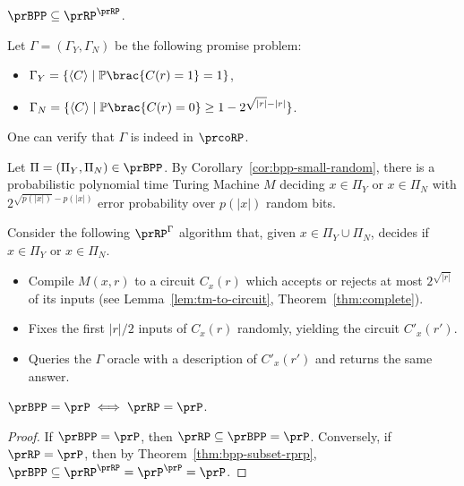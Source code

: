 \begin{theorem}\label{thm:bpp-subset-rprp}
    $\prBPP \subseteq \prRP^\prRP$.
\end{theorem}

\begin{proofsk}
    Let $\Gamma = (\Gamma_Y, \Gamma_N)$ be the following promise problem:
    \begin{itemize}
        \item $\Gamma_Y = \set{\langle C \rangle \mid \Pr\brac{C(r) = 1} = 1}$,
        \item $\Gamma_N = \set{\langle C \rangle \mid \Pr\brac{C(r) = 0} \geq 1 - 2^{\sqrt{|r|} - |r|}}$.
    \end{itemize}
    One can verify that $\Gamma$ is indeed in $\prcoRP$.

    Let $\Pi = (\Pi_Y, \Pi_N) \in \prBPP$.
    By Corollary~\ref{cor:bpp-small-random}, there is a probabilistic polynomial time 
    Turing Machine $M$ deciding $x \in \Pi_Y$ or $x \in \Pi_N$ with $2^{\sqrt{p(|x|)} 
    - p(|x|)}$ error probability over $p(|x|)$ random bits.
    
    Consider the following $\prRP^\Gamma$ algorithm that, given $x \in \Pi_Y \cup \Pi_N$, 
    decides if $x \in \Pi_Y$ or $x \in \Pi_N$.
    \begin{itemize}
        \item Compile $M(x,r)$ to a circuit $C_x(r)$ which accepts or rejects at most 
            $2^{\sqrt{|r|}}$ of its inputs (see Lemma~\ref{lem:tm-to-circuit}, 
            Theorem~\ref{thm:complete}).
        \item Fixes the first $|r|/2$ inputs of $C_x(r)$ randomly, yielding the circuit 
            $C'_x(r')$.
        \item Queries the $\Gamma$ oracle with a description of $C'_x(r')$ and returns 
            the same answer.
    \end{itemize}

\end{proofsk}

\begin{corollary}
    $\prBPP = \prP \iff \prRP = \prP$.
\end{corollary}

\begin{proof}
    If $\prBPP = \prP$, then $\prRP \subseteq \prBPP = \prP$.
    Conversely, if $\prRP = \prP$, then by Theorem~\ref{thm:bpp-subset-rprp}, $\prBPP \subseteq \prRP^\prRP = \prP^\prP
    = \prP$.
\end{proof}


